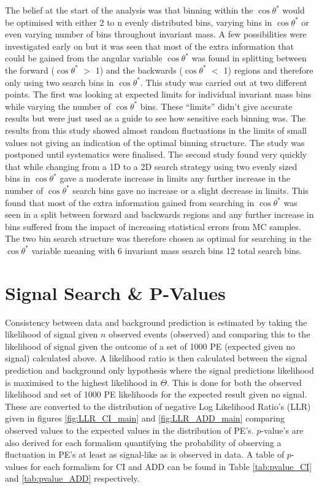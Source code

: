     The belief at the start of the analysis was that binning within the $\cos{\theta^{*}}$ would be optimised with either 2 to n evenly distributed bins, varying bins in $\cos{\theta^{*}}$ or even varying number of bins throughout invariant mass. A few possibilities were investigated early on but it was seen that most of the extra information that could be gained from the angular variable $\cos{\theta^{*}}$ was found in splitting between the forward ($\cos{\theta^{*}}$ $>$ 1) and the backwards ($\cos{\theta^{*}}$ $<$ 1) regions and therefore only using two search bins in $\cos{\theta^{*}}$. This study was carried out at two different points. The first was looking at expected limits for individual invariant mass bins while varying the number of $\cos{\theta^{*}}$ bins. These ``limits'' didn't give accurate results but were just used as a guide to see how sensitive each binning was. The results from this study showed almost random fluctuations in the limits of small values not giving an indication of the optimal binning structure. The study was postponed until systematics were finalised. The second study found very quickly that while changing from a 1D to a 2D search strategy using two evenly sized bins in $\cos{\theta^{*}}$ gave a moderate increase in limits any further increase in the number of $\cos{\theta^{*}}$ search bins gave no increase or a slight decrease in limits. This found that most of the extra information gained from searching in $\cos{\theta^{*}}$ was seen in a split between forward and backwards regions and any further increase in bins suffered from the impact of increasing statistical errors from MC samples. The two bin search structure was therefore chosen as optimal for searching in the $\cos{\theta^{*}}$ variable meaning with 6 invariant mass search bins 12 total search bins. 



\section{Signal Search \& P-Values}

    Consistency between data and background prediction is estimated by taking the likelihood of signal given $n$ observed events (observed) and comparing this to the likelihood of signal given the outcome of a set of 1000 PE (expected given no signal) calculated above. A likelihood ratio is then calculated between the signal prediction and background only hypothesis where the signal predictions likelihood is maximised to the highest likelihood in $\Theta$. This is done for both the observed likelihood and set of 1000 PE likelihoods for the expected result given no signal. These are converted to the distribution of negative Log Likelihood Ratio's (LLR) given in figures \ref{fig:LLR_CI_main} and \ref{fig:LLR_ADD_main} comparing observed values to the expected values in the distribution of PE's. $p$-value's are also derived for each formalism quantifying the probability of observing a fluctuation in PE's at least as signal-like as is observed in data. A table of $p$-values for each formalism for CI and ADD can be found in Table \ref{tab:pvalue_CI} and \ref{tab:pvalue_ADD} respectively. 


